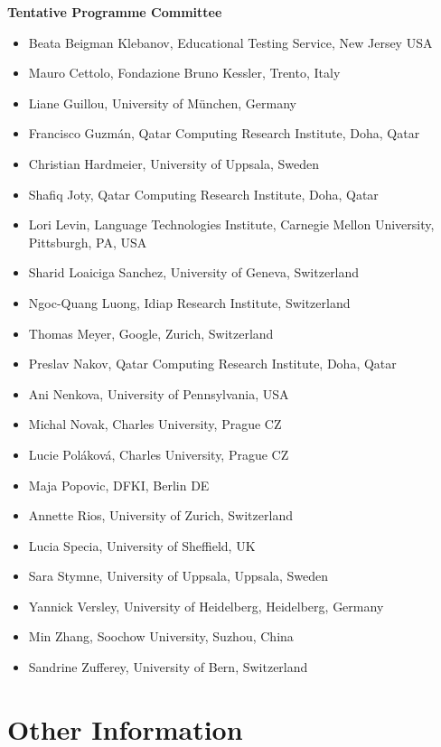 \documentclass[11pt]{article}
\begin{document}
\medskip

\textbf{Tentative Programme Committee}

\begin{itemize}
\item Beata Beigman Klebanov, Educational Testing Service, New Jersey USA
\item Mauro Cettolo, Fondazione Bruno Kessler, Trento, Italy
\item Liane Guillou, University of München, Germany
\item Francisco Guzm\'{a}n, Qatar Computing Research Institute, Doha, Qatar
\item Christian Hardmeier, University of Uppsala, Sweden
\item Shafiq Joty, Qatar Computing Research Institute, Doha, Qatar
\item Lori Levin, Language Technologies Institute, Carnegie Mellon University, Pittsburgh, PA, USA
\item Sharid Loaiciga Sanchez, University of Geneva, Switzerland
\item Ngoc-Quang Luong, Idiap Research Institute, Switzerland
\item Thomas Meyer, Google, Zurich, Switzerland
\item Preslav Nakov, Qatar Computing Research Institute, Doha, Qatar
\item Ani Nenkova, University of Pennsylvania, USA
\item Michal Novak, Charles University, Prague CZ
\item Lucie Pol\'{a}kov\'{a}, Charles University, Prague CZ
\item Maja Popovic, DFKI, Berlin DE
\item Annette Rios, University of Zurich, Switzerland
\item Lucia Specia, University of Sheffield, UK
\item Sara Stymne, University of Uppsala, Uppsala, Sweden
\item Yannick Versley, University of Heidelberg, Heidelberg, Germany
\item Min Zhang, Soochow University, Suzhou, China
\item Sandrine Zufferey, University of Bern, Switzerland
\end{itemize}


\section{Other Information}
\end{document}
